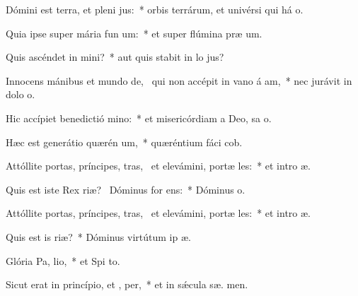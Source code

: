 \item Dómini est terra, et pleni jus:~* orbis terrárum, et univérsi qui há  o.
\item Quia ipse super mária fun um:~* et super flúmina præ um.
\item Quis ascéndet in  mini?~* aut quis stabit in lo  jus?
\item Innocens mánibus et mundo de,~\pscross{} qui non accépit in vano á am,~* nec jurávit in dolo  o.
\item Hic accípiet benedictió  mino:~* et misericórdiam a Deo, sa o.
\item Hæc est generátio quærén um,~* quæréntium fáci  cob.
\item Attóllite portas, príncipes, tras,~\pscross{} et elevámini, portæ les:~* et intro  æ.
\item Quis est iste Rex riæ?~\pscross{} Dóminus for  ens:~* Dóminus   o.
\item Attóllite portas, príncipes, tras,~\pscross{} et elevámini, portæ les:~* et intro  æ.
\item Quis est is  riæ?~* Dóminus virtútum ip   æ.
\item Glória Pa,  lio,~* et Spi to.
\item Sicut erat in princípio, et ,  per,~* et in sǽcula sæ. men.
